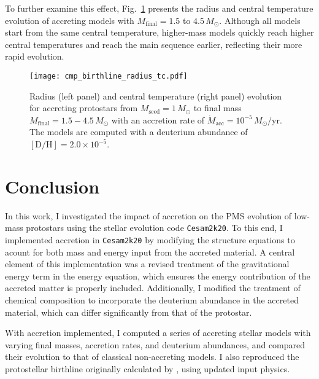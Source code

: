 \documentclass[12pt,a4paper]{article}
\newcommand{\mr}{\mathrm}
\begin{document}
To further examine this effect, Fig.~\ref{fig:cmp_birthline_radius_tc} presents the radius and central temperature evolution of accreting models with $M_\mr{final} = 1.5$ to $4.5\,M_\odot$. Although all models start from the same central temperature, higher-mass models quickly reach higher central temperatures and reach the main sequence earlier, reflecting their more rapid evolution.

\begin{figure}
  \centering
  \texttt{[image: cmp\_birthline\_radius\_tc.pdf]}
  \caption{Radius (left panel) and central temperature (right panel) evolution for accreting protostars from $M_\mr{seed} = 1\,M_\odot$ to final mass $M_\mr{final} = 1.5-4.5\,M_\odot$ with an accretion rate of $\dot{M}_\mr{acc} = 10^{-5}\,M_\odot/\mr{yr}$. The models are computed with a deuterium abundance of $[\mr{D/H}] = 2.0 \times 10^{-5}$.}
  \label{fig:cmp_birthline_radius_tc}
\end{figure}


\section{Conclusion}
\label{sec:conclusion}

In this work, I investigated the impact of accretion on the PMS evolution of low-mass protostars using the stellar evolution code \texttt{Cesam2k20}. To this end, I implemented accretion in \texttt{Cesam2k20} by modifying the structure equations to acount for both mass and energy input from the accreted material. A central element of this implementation was a revised treatment of the gravitational energy term in the energy equation, which ensures the energy contribution of the accreted matter is properly included. Additionally, I modified the treatment of chemical composition to incorporate the deuterium abundance in the accreted material, which can differ significantly from that of the protostar.

With accretion implemented, I computed a series of accreting stellar models with varying final masses, accretion rates, and deuterium abundances, and compared their evolution to that of classical non-accreting models. I also reproduced the protostellar birthline originally calculated by \textcite{PallaStahler1993}, using updated input physics.
\end{document}
